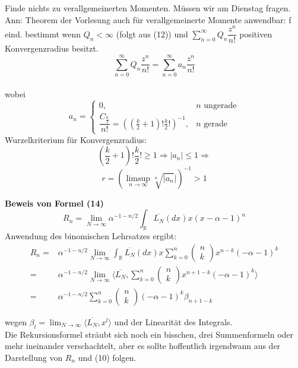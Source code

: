 \documentclass[a4paper, 11pt]{scrreprt}
\newcommand{\RR}{\mathbb{R}}
\begin{document}
Finde nichts zu verallgemeinerten Momenten. Müssen wir am Dienstag fragen.\\
Ann: Theorem der Vorlesung auch für verallgemeinerte Momente anwendbar: f eind. bestimmt wenn $ Q_n< \infty $ (folgt aus (12)) und $ \sum_{n=0}^{\infty} Q_n \dfrac{z^n}{n!}$ positiven Konvergenzradius besitzt.\\
\[ \sum_{n=0}^{\infty} Q_n \dfrac{z^n}{n!}= \sum_{n=0}^{\infty} a_n \dfrac{z^n}{n!}\]\\
wobei \[ a_n=\begin{cases} 0, &n\text{ ungerade}\\
	\dfrac{C_{\frac n 2}}{n!}=((\frac{k}{2}+1)!\frac{k}{2}!)^{-1}, &n\text{ gerade} \end{cases} \]
	Wurzelkriterium für Konvergenzradius: 
	\[(\frac{k}{2}+1)!\frac{k}{2}! \geq 1 \Rightarrow \vert a_n \vert \leq 1 \Rightarrow \]
	\[ r=(\limsup_{n \to \infty} \sqrt[n]{\vert a_n} \vert )^{-1} >1 \]
	


\textbf{Beweis von Formel (14)}\\
\begin{equation}
R_n=\lim_{N \to \infty} \alpha^{-1-n/2} \int_{\RR}\overline{L_{N}}(dx)x(x-\alpha-1)^{n} 
\end{equation}
Anwendung des binomischen Lehrsatzes ergibt:
\begin{align*}
 R_n =& \alpha^{-1-n/2} \lim_{N \to \infty} \int_{\RR}\overline{L_{N}}(dx)x \sum_{k=0}^n \begin{pmatrix} n\\k\end{pmatrix} x^{n-k}(-\alpha -1)^k \\
 =& \alpha^{-1-n/2} \lim_{N \to \infty} \langle \overline{L_{N}}, \sum_{k=0}^n \begin{pmatrix} n\\k\end{pmatrix} x^{n+1-k}(-\alpha -1)^k \rangle \\
 =& \alpha^{-1-n/2}\sum_{k=0}^n \begin{pmatrix} n\\k\end{pmatrix} (-\alpha -1)^k \beta_{n+1-k}
\end{align*}

wegen $\beta_l = \lim_{N\to\infty} \langle \overline{L_N}, x^l \rangle$ und der Linearität des Integrals.\\
Die Rekursionsformel sträubt sich noch ein bisschen, drei Summenformeln oder mehr ineinander verschachtelt, aber es sollte hoffentlich irgendwann aus der Darstellung von $ R_n $ und (10) folgen. \\
\end{document}

